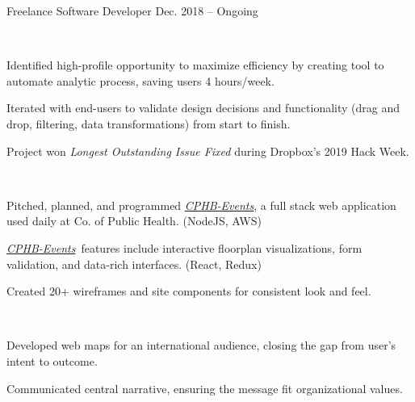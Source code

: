 \newcommand*{\cphbevts}[0]{\href{https://cphb-events.public-health.uiowa.edu/}{\textit{CPHB-Events}}}

\begin{cventries}
  \cventry
    {}
    {Freelance Software Developer}
    {Dec. 2018 -- Ongoing}
    {}
    {%
      \vspace{-1.4\baselineskip}
      \begin{cvitems}
        \item {\\
          \begin{projectitems}
            \item [\textendash] {Identified high-profile opportunity to maximize efficiency by creating tool to automate analytic process, saving users 4 hours/week.}
            \item [\textendash] {Iterated with end-users to validate design decisions and functionality (drag and drop, filtering, data transformations) from start to finish.}
            \item [\textendash] {Project won \textit{Longest Outstanding Issue Fixed} during Dropbox's 2019 Hack Week.}
          \end{projectitems}
        }
        \item {\\
          \begin{projectitems}
            \item [\textendash] {Pitched, planned, and programmed \cphbevts, a full stack web application used daily at Co. of Public Health. (NodeJS, AWS)}
            \item [\textendash] {\cphbevts\ features include interactive floorplan visualizations, form validation, and data-rich interfaces. (React, Redux)}
            \item [\textendash] {Created 20+ wireframes and site components for consistent look and feel.}
          \end{projectitems}
        }
        \item {\\
          \begin{projectitems}
            \item [\textendash] {Developed web maps for an international audience, closing the gap from user's intent to outcome.}
            \item [\textendash] {Communicated central narrative, ensuring the message fit organizational values.}
          \end{projectitems}
        }
      \end{cvitems}
  }


\end{cventries}

